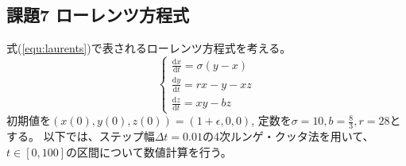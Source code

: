 \documentclass[a4j, titlepage]{jsarticle}
\numberwithin{equation}{section}
\begin{document}
    \subsection{課題7 ローレンツ方程式}
        式(\ref{equ:laurents})で表されるローレンツ方程式を考える。
        \begin{equation}
            \begin{cases}
                \displaystyle\frac{\mathrm{d}x}{\mathrm{d}t} = \sigma(y-x) \\
                \displaystyle\frac{\mathrm{d}y}{\mathrm{d}t} = rx - y - xz \\
                \displaystyle\frac{\mathrm{d}z}{\mathrm{d}t} = xy - bz
            \end{cases} \label{equ:laurents}
        \end{equation}
        初期値を$(x(0), y(0), z(0)) = (1 + \epsilon, 0, 0)$,
        定数を$\sigma = 10, b = \displaystyle\frac{8}{3}, r = 28$とする。
        以下では、ステップ幅$\Delta t = 0.01$の4次ルンゲ・クッタ法を用いて、
        $t\in[0, 100]$の区間について数値計算を行う。
\end{document}
